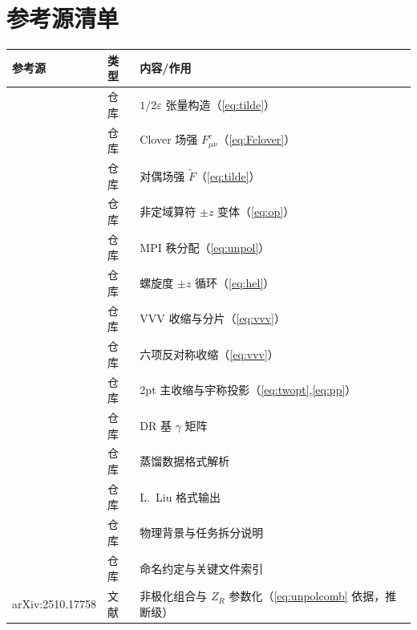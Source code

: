 \documentclass[UTF8]{ctexart}
\begin{document}
\section{参考源清单}
\begin{xltabular}{\textwidth}{llX}
\toprule
\textcolor{evidence}{参考源} & 类型 & 内容/作用 \\
\midrule
\endhead
\texttt{} & 仓库 & $1/2\varepsilon$ 张量构造（\eqref{eq:tilde}） \\
\texttt{} & 仓库 & Clover 场强 $F^c_{\mu\nu}$（\eqref{eq:Fclover}） \\
\texttt{} & 仓库 & 对偶场强 $\widetilde F$（\eqref{eq:tilde}） \\
\texttt{} & 仓库 & 非定域算符 $\pm z$ 变体（\eqref{eq:op}） \\
\texttt{} & 仓库 & MPI 秩分配（\eqref{eq:unpol}） \\
\texttt{} & 仓库 & 螺旋度 $\pm z$ 循环（\eqref{eq:hel}） \\
\texttt{} & 仓库 & VVV 收缩与分片（\eqref{eq:vvv}） \\
\texttt{} & 仓库 & 六项反对称收缩（\eqref{eq:vvv}） \\
\texttt{} & 仓库 & 2pt 主收缩与宇称投影（\eqref{eq:twopt},\eqref{eq:pp}） \\
\texttt{} & 仓库 & DR 基 $\gamma$ 矩阵 \\
\texttt{} & 仓库 & 蒸馏数据格式解析 \\
\texttt{} & 仓库 & L.~Liu 格式输出 \\
\texttt{} & 仓库 & 物理背景与任务拆分说明 \\
\texttt{} & 仓库 & 命名约定与关键文件索引 \\
arXiv:2510.17758 & 文献 & 非极化组合与 $Z_R$ 参数化（\eqref{eq:unpolcomb} 依据，推断级） \\
\bottomrule
\end{xltabular}

\end{document}
